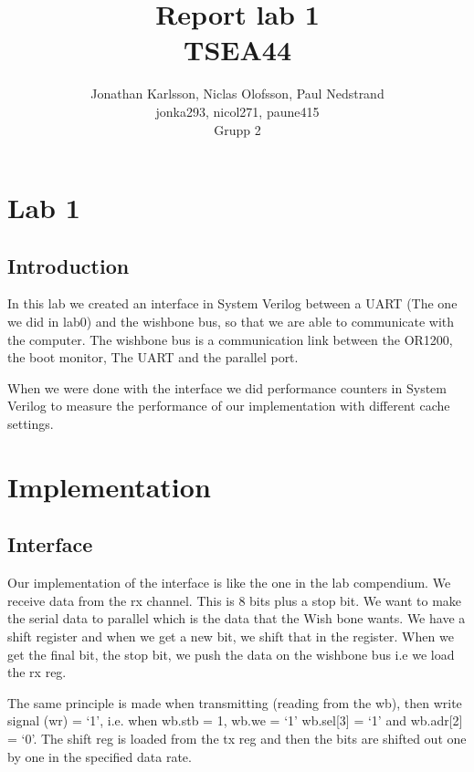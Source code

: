 \documentclass[a4paper]{article}
\author{Jonathan Karlsson, Niclas Olofsson, Paul Nedstrand\\jonka293, nicol271, paune415\\Grupp 2}
\title{Report lab 1\\ \vspace{2 mm} {\large TSEA44}}
\begin{document}
\maketitle

\newpage

\tableofcontents

\newpage
\section{Lab 1}
\subsection{Introduction}


In this lab we created an interface in System Verilog between a UART
(The one we did in lab0) and the wishbone bus, so that we are able to
communicate with the computer. The wishbone bus is a communication link
between the OR1200, the boot monitor, The UART and the parallel port.

When we were done with the interface we did performance counters in
System Verilog to measure the performance of our implementation with
different cache settings.


\section{Implementation}

\subsection{Interface}

Our implementation of the interface is like the one in the lab
compendium. We receive data from the rx channel. This is 8 bits plus a
stop bit. We want to make the serial data to parallel which is the data
that the Wish bone wants. We have a shift register and when we get a new
bit, we shift that in the register. When we get the final bit, the stop
bit, we push the data on the wishbone bus i.e we load the rx reg.

The same principle is made when transmitting (reading from the wb), then
write signal (wr) = ‘1’,  i.e. when wb.stb = 1, wb.we  = ‘1’ wb.sel[3] =
‘1’ and wb.adr[2] = ‘0’. The shift reg is loaded from the tx reg and
then the bits are shifted out one by one in the specified data rate.
\end{document}
